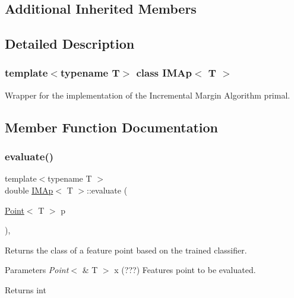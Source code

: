 \subsection*{Additional Inherited Members}


\subsection{Detailed Description}
\subsubsection*{template$<$typename T$>$\newline
class I\+M\+Ap$<$ T $>$}

Wrapper for the implementation of the Incremental Margin Algorithm primal. 

\subsection{Member Function Documentation}
\mbox{\label{class_i_m_ap_a41b0739cdc486e3f21e7927f1ad429a8}} 
\subsubsection{\texorpdfstring{evaluate()}{evaluate()}}
{\footnotesize\ttfamily template$<$typename T $>$ \\
double \mbox{\hyperlink{class_i_m_ap}{I\+M\+Ap}}$<$ T $>$\+::evaluate (\begin{DoxyParamCaption}\item[{\mbox{\hyperlink{class_point}{Point}}$<$ T $>$}]{p }\end{DoxyParamCaption})\hspace{0.3cm}{\ttfamily [override]}, {\ttfamily [virtual]}}



Returns the class of a feature point based on the trained classifier. 


\begin{DoxyParams}{Parameters}
{\em Point$<$} & T $>$ x (???) Features point to be evaluated. \\
\hline
\end{DoxyParams}
\begin{DoxyReturn}{Returns}
int 
\end{DoxyReturn}


